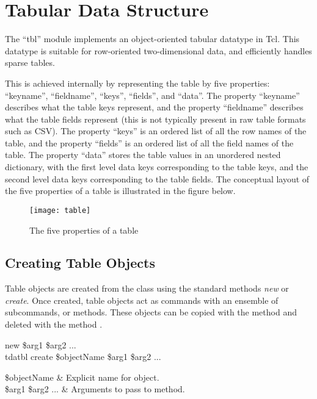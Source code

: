 \cleartooddpage[\thispagestyle{empty}]
\chapter{Tabular Data Structure}\label{tbl}
The ``tbl'' module implements an object-oriented tabular datatype in Tcl. 
This datatype is suitable for row-oriented two-dimensional data, and efficiently handles sparse tables. 

This is achieved internally by representing the table by five properties: ``keyname'', ``fieldname'', ``keys'', ``fields'', and ``data''. The property ``keyname'' describes what the table keys represent, and the property ``fieldname'' describes what the table fields represent (this is not typically present in raw table formats such as CSV). The property ``keys'' is an ordered list of all the row names of the table, and the property ``fields'' is an ordered list of all the field names of the table. The property ``data'' stores the table values in an unordered nested dictionary, with the first level data keys corresponding to the table keys, and the second level data keys corresponding to the table fields. The conceptual layout of the five properties of a table is illustrated in the figure below.
\vspace{\baselineskip}
\FloatBarrier
\begin{figure}[!htb]
    \centering
    \texttt{[image: table]}
    \caption{The five properties of a table}
    \label{fig:table_props}
\end{figure}
\clearpage
\section{Creating Table Objects}
Table objects are created from the  class using the standard methods \textit{new} or \textit{create}. 
Once created, table objects act as commands with an ensemble of subcommands, or methods. 
These objects can be copied with the method  and deleted with the method .
\begin{syntax}
 new \$arg1 \$arg2 ...\\
tdatbl create \$objectName \$arg1 \$arg2 ...
\end{syntax}
\begin{args}
\$objectName & Explicit name for object. \\
\$arg1 \$arg2 ... & Arguments to pass to  method.
\end{args}

